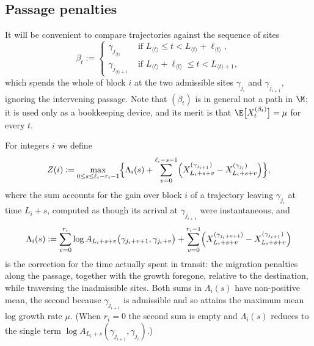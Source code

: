 \documentclass[11pt]{amsart}
\begin{document}
\subsection{Passage penalties}
It will be convenient to compare trajectories against the sequence of sites
\begin{equation} \label{E:betadef}
	\beta_t := \begin{cases}
		\gamma_{j_{\langle t\rangle}} & \text{ if } L_{\langle t\rangle}\le t< L_{\langle t\rangle}+\ell_{\langle t\rangle},\\
		\gamma_{j_{\langle t\rangle+1}} & \text{ if } L_{\langle t\rangle}+\ell_{\langle t\rangle}\le t< L_{\langle t\rangle+1},
	\end{cases}
\end{equation}
which spends the whole of block $i$ at the two admissible sites $\gamma_{j_i}$ and $\gamma_{j_{i+1}}$, ignoring the intervening passage.
Note that $(\beta_t)$ is in general not a path in $\M$; it is used only as a bookkeeping device, and its
merit is that $\E\bigl[X^{(\beta_t)}_t\bigr]=\mu$ for every $t$.

For integers $i$ we define
\begin{equation} \label{E:Zi}
	Z(i):= \max_{0\le s \le \ell_i -r_i-1 }\Bigl\{ \Lambda_i(s) +
	\sum_{v=0}^{\ell_{i}-s-1} \Bigl(
	X^{(\gamma_{j_{i+1}})}_{L_i+s+v} - X^{(\gamma_{j_{i}})}_{L_i+s+v} \Bigr) \Bigr\},
\end{equation}
where the sum accounts for the gain over block $i$ of a trajectory leaving
$\gamma_{j_i}$ at time $L_i+s$, computed as though its arrival at $\gamma_{j_{i+1}}$
were instantaneous, and
\begin{equation} \label{E:Lambda}
	\begin{split}
		\Lambda_i(s):= \sum_{v=0}^{r_i} \log A_{L_i+s+v}\bigl(\gamma_{j_i+v+1},\gamma_{j_i+v}\bigr)
		+ \sum_{v=0}^{r_i-1} \Bigl( X^{(\gamma_{j_i+v+1})}_{L_i+s+v} - X^{(\gamma_{j_{i+1}})}_{L_i+s+v} \Bigr)
	\end{split}
\end{equation}
is the correction for the time actually spent in transit: the migration penalties
along the passage, together with the growth foregone, relative to the destination,
while traversing the inadmissible sites.
Both sums in $\Lambda_i(s)$ have non-positive mean, the second
because $\gamma_{j_{i+1}}$ is admissible and so attains the maximum mean log growth
rate $\mu$. (When $r_i=0$ the second sum is empty and $\Lambda_i(s)$ reduces to the
single term $\log A_{L_i+s}(\gamma_{j_{i+1}},\gamma_{j_i})$.)
\end{document}
